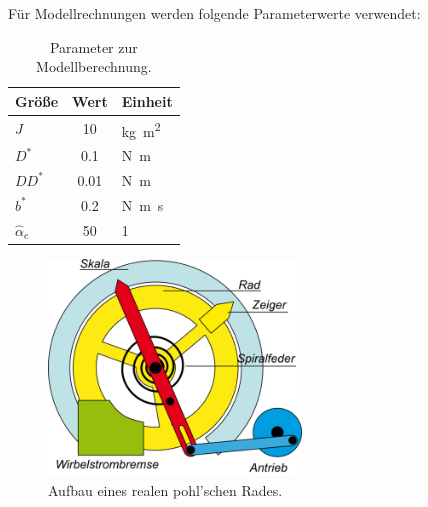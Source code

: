         Für Modellrechnungen werden folgende Parameterwerte verwendet:
        \begin{table}[h]
            \centering
            \caption{Parameter zur Modellberechnung.}\label{tab:params modellberechnung}
            \begin{tabular}{@{}lSl@{}}
                \toprule
                Größe& {Wert}& Einheit\\
                \midrule
                \(J\)& 10& \unit{\kilo\gram\metre\squared}\\
                \(D^\ast\)& 0.1& \unit{\newton\metre}\\
                \(DD^\ast\)& 0.01& \unit{\newton\metre}\\
                \(b^\ast\)& 0.2& \unit{\newton\metre\second}\\
                \(\hat{\alpha}_e\)& 50& \unit{1}\\
                \bottomrule
            \end{tabular}
        \end{table}

        \begin{figure}[htbp]
            \centering
            \includegraphics[width=0.6\textwidth]{Bilder/Kapitel-1/Aufbau Pohl'sches Rad.png}
            \caption[Aufbau eines realen pohl'schen Rades]{Aufbau eines realen pohl'schen Rades.}\label{Aufbau Pohl'sches Rad}
            \end{figure}


